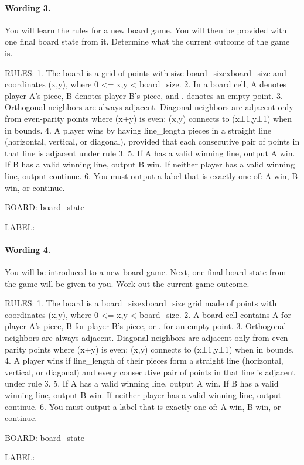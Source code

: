 \paragraph{Wording 3.}
\begin{promptbox}
You will learn the rules for a new board game. You will then be provided with one final board state from it. Determine what the current outcome of the game is.

RULES:
1. The board is a grid of points with size {board_size}x{board_size} and coordinates (x,y), where 0 <= x,y < {board_size}.
2. In a board cell, A denotes player A's piece, B denotes player B's piece, and . denotes an empty point.
3. Orthogonal neighbors are always adjacent. Diagonal neighbors are adjacent only from even-parity points where (x+y) is even: (x,y) connects to (x±1,y±1) when in bounds.
4. A player wins by having {line_length} pieces in a straight line (horizontal, vertical, or diagonal), provided that each consecutive pair of points in that line is adjacent under rule 3.
5. If A has a valid winning line, output A win. If B has a valid winning line, output B win. If neither player has a valid winning line, output continue.
6. You must output a label that is exactly one of: A win, B win, or continue.

BOARD:
{board_state}

LABEL:
\end{promptbox}

\paragraph{Wording 4.}
\begin{promptbox}
You will be introduced to a new board game. Next, one final board state from the game will be given to you. Work out the current game outcome.

RULES:
1. The board is a {board_size}x{board_size} grid made of points with coordinates (x,y), where 0 <= x,y < {board_size}.
2. A board cell contains A for player A's piece, B for player B's piece, or . for an empty point.
3. Orthogonal neighbors are always adjacent. Diagonal neighbors are adjacent only from even-parity points where (x+y) is even: (x,y) connects to (x±1,y±1) when in bounds.
4. A player wins if {line_length} of their pieces form a straight line (horizontal, vertical, or diagonal) and every consecutive pair of points in that line is adjacent under rule 3.
5. If A has a valid winning line, output A win. If B has a valid winning line, output B win. If neither player has a valid winning line, output continue.
6. You must output a label that is exactly one of: A win, B win, or continue.

BOARD:
{board_state}

LABEL:
\end{promptbox}

